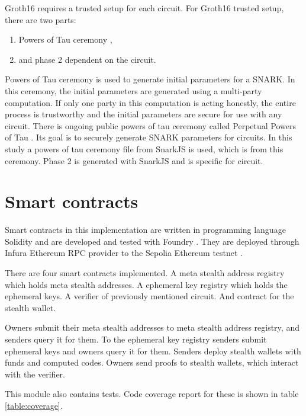 Groth16 requires a trusted setup for each circuit. For Groth16 trusted
setup, there are two parts:
\begin{enumerate}
    \item Powers of Tau ceremony \cite{PowersOfTau},
    \item and phase 2 dependent on the circuit.
\end{enumerate}
Powers of Tau ceremony is used to generate initial parameters for a SNARK.
In this ceremony, the initial parameters are generated using a multi-party
computation. If only one party in this computation is acting honestly,
the entire process is trustworthy and the initial parameters are secure
for use with any circuit. There is ongoing public powers of tau ceremony
called Perpetual Powers of Tau \cite{PerpetualPTAU}. Its goal is to
securely generate SNARK parameters for circuits. In this study a powers
of tau ceremony file from SnarkJS \cite{snarkjs} is used, which is from
this ceremony. Phase 2 is generated with SnarkJS and is specific for circuit.

\section{Smart contracts}

Smart contracts in this implementation are written in programming
language Solidity \cite{solidity} and are developed and tested
with Foundry \cite{foundry}. They are deployed through
Infura \cite{infura} Ethereum RPC provider to the Sepolia Ethereum
testnet \cite{sepolia}.

There are four smart contracts implemented. A meta stealth address
registry which holds meta stealth addresses. A ephemeral key registry
which holds the ephemeral keys. A verifier of previously mentioned
circuit. And contract for the stealth wallet.

Owners submit their meta stealth addresses to meta stealth address registry,
and senders query it for them. To the ephemeral key registry senders submit
ephemeral keys and owners query it for them. Senders deploy stealth wallets
with funds and computed codes. Owners send proofs to stealth wallets,
which interact with the verifier.

This module also contains tests. Code coverage report for these is shown in
table \ref{table:coverage}.

